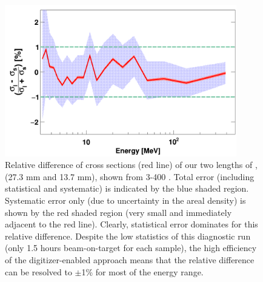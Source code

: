 \begin{figure}[tb]
    \centering
    \includegraphics[width=0.9\textwidth]{figures/relativeDiff_longCarbonShortCarbon.png}
    \caption[Neutron \tot\ relative difference between short and long \cNat\ samples]
    {
        Relative difference of cross sections (red line) of
        our two lengths of \cNat, (27.3 mm and 13.7 mm), shown from 3-400
        \mega\electronvolt. Total error
        (including statistical and systematic) is indicated by the blue
        shaded region. Systematic error only (due to uncertainty in the areal
        density) is shown by the red shaded region (very small and immediately adjacent to 
        the red line). Clearly, statistical error dominates for this relative
        difference.
        Despite the low statistics of this diagnostic run (only 1.5 hours
        beam-on-target for each sample), the high efficiency of the
        digitizer-enabled approach means that the relative difference can be resolved to 
        $\pm$1\% for most of the energy range.
    }

    \label{CarbonBenchmarking}
\end{figure}

